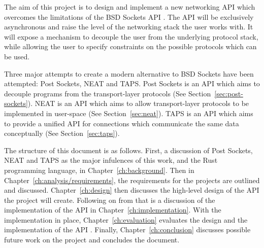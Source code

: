 \documentclass{l4proj}
\begin{document}
The aim of this project is to design and implement a new networking API which overcomes the limitations of the BSD
Sockets API .
The API will be exclusively asynchronous and raise the level of the networking stack the user works with.
It will expose a mechanism to decouple the user from the underlying protocol stack, while allowing the user to specify
constraints on the possible protocols which can be used.

Three major attempts to create a modern alternative to BSD Sockets have been attempted: Post Sockets, NEAT and TAPS.
Post Sockets is an API which aims to decouple programs from the transport-layer protocols
(See Section~\ref{sec:post-sockets}).
NEAT is an API which aims to allow transport-layer protocols to be implemented in user-space
(See Section~\ref{sec:neat}).
TAPS is an API which aims to provide a unified API for connections which communicate the same data conceptually
(See Section~\ref{sec:taps}).

The structure of this document is as follows.
First, a discussion of Post Sockets, NEAT and TAPS as the major infulences of this work, and the Rust programming
language, in Chapter~\ref{ch:background}.
Then in Chapter~\ref{ch:analysis/requirements}, the requirements for the projects are outlined and discussed.
Chapter~\ref{ch:design} then discusses the high-level design of the API the project will create.
Following on from that is a discussion of the implementation of the API in Chapter~\ref{ch:implementation}.
With the implementation in place, Chapter~\ref{ch:evaluation} evaluates the design and the implementation of the API .
Finally, Chapter~\ref{ch:conclusion} discusses possible future work on the project and concludes the document.
\end{document}
